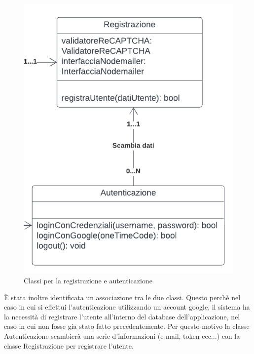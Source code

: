 \begin{figure}[!h]
\centering
\includegraphics[scale=0.35]{images/classe_registrazione_autenticazione.png}
\caption{Classi per la registrazione e autenticazione}
\label{fig:classe_registrazione_autenticazione}
\end{figure}
\noindent
È stata inoltre identificata un associazione tra le due classi. Questo perchè nel caso in cui si effettui l'autenticazione utilizzando un account google, il sistema ha la necessità di registrare l'utente all'interno del database dell'applicazione, nel caso in cui non fosse gia stato fatto precedentemente. Per questo motivo la classe Autenticazione scambierà una serie d'informazioni (e-mail, token ecc...) con la classe Registrazione per registrare l'utente.

\newpage
